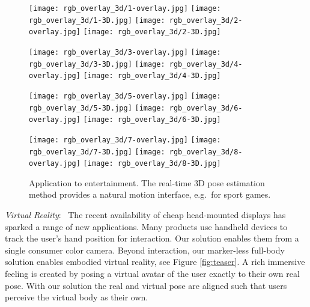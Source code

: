 \documentclass[acmtog]{acmart}
\newcommand{\parahead}[1]{\vspace{5pt}\noindent\emph{#1}:\ }
\newcommand{\change}[1]{{#1}}
\begin{document}
\begin{figure}
\center
\texttt{[image: rgb\_overlay\_3d/1-overlay.jpg]}
\texttt{[image: rgb\_overlay\_3d/1-3D.jpg]}
\hspace{0.15cm}
\texttt{[image: rgb\_overlay\_3d/2-overlay.jpg]}
\texttt{[image: rgb\_overlay\_3d/2-3D.jpg]}

\vspace{0.25cm}

\texttt{[image: rgb\_overlay\_3d/3-overlay.jpg]}
\texttt{[image: rgb\_overlay\_3d/3-3D.jpg]}
\hspace{0.15cm}
\texttt{[image: rgb\_overlay\_3d/4-overlay.jpg]}
\texttt{[image: rgb\_overlay\_3d/4-3D.jpg]}

\vspace{0.25cm}

\texttt{[image: rgb\_overlay\_3d/5-overlay.jpg]}
\texttt{[image: rgb\_overlay\_3d/5-3D.jpg]}
\hspace{0.15cm}
\texttt{[image: rgb\_overlay\_3d/6-overlay.jpg]}
\texttt{[image: rgb\_overlay\_3d/6-3D.jpg]}

\vspace{0.25cm}

\texttt{[image: rgb\_overlay\_3d/7-overlay.jpg]}
\texttt{[image: rgb\_overlay\_3d/7-3D.jpg]}
\hspace{0.15cm}
\texttt{[image: rgb\_overlay\_3d/8-overlay.jpg]}
\texttt{[image: rgb\_overlay\_3d/8-3D.jpg]}
\caption{Application to entertainment. The real-time 3D pose estimation method provides a natural motion interface, e.g.~for sport games.}
\label{fig:entertainment}
\end{figure}

\parahead{Virtual Reality}
The recent availability of cheap head-mounted displays has sparked a range of new applications.
Many products use handheld devices to track the user's hand position for interaction.
Our solution enables them from a single consumer color camera.
Beyond interaction, our marker-less full-body solution enables embodied virtual reality, see Figure \ref{fig:teaser}.
A rich immersive feeling is created by posing a virtual avatar of the user exactly to \change{their} own real pose.
With our solution the real and virtual pose are aligned such that users perceive the virtual body as their own.
\end{document}
